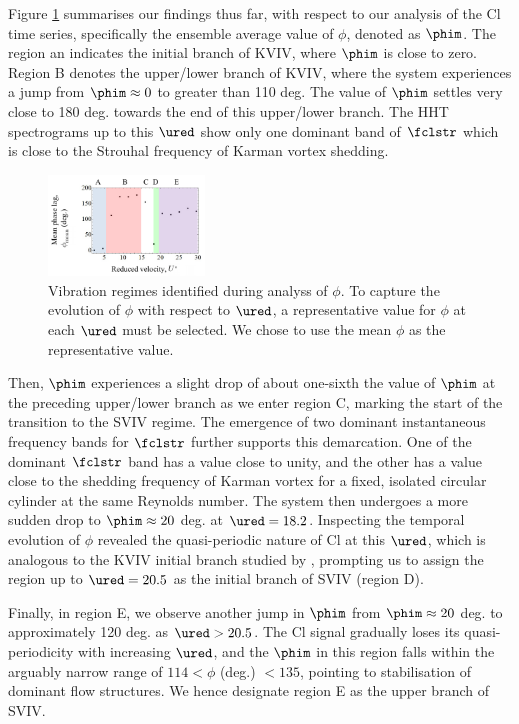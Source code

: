 \documentclass[a4paper,fleqn]{cas-sc}
\begin{document}
Figure \ref{fig:phaseAngleRegime} summarises our findings thus far, with respect to our analysis of the Cl time series, specifically the ensemble average value of  $\phi$, denoted as $\phim$. The region an indicates the initial branch of  KVIV, where  $\phim$ is close to zero. Region B denotes the upper/lower branch of  KVIV, where the system experiences a jump from  $\phim \approx 0$ to greater than 110 deg. The value of $\phim$ settles very close to 180 deg. towards the end of this upper/lower branch. The HHT spectrograms up to this $\ured$ show only one dominant band of $\fclstr$ which is close to the Strouhal frequency of Karman vortex shedding.

\begin{figure}
  \centering
  \includegraphics[width=0.37\textwidth]{figs/figure19}
  \caption{Vibration regimes identified during analyss of $\phi$. To capture the evolution of $\phi$ with respect to $\ured$, a representative value for $\phi$ at each $\ured$ must be selected. We chose to use the mean $\phi$ as the representative value.}
  \label{fig:phaseAngleRegime}
\end{figure}

Then, $\phim$ experiences a slight drop of about one-sixth the value of $\phim$ at the preceding upper/lower branch as we enter region C, marking the start of the transition to the SVIV regime. The emergence of two dominant instantaneous frequency bands for $\fclstr$ further supports this demarcation. One of the dominant $\fclstr$ band has a value close to unity, and the other has a value close to the shedding frequency of Karman vortex for a fixed, isolated circular cylinder at the same Reynolds number. The system then undergoes a more sudden drop to $\phim \approx 20$ deg. at $\ured = 18.2$. Inspecting the temporal evolution of $\phi$ revealed the quasi-periodic nature of Cl at this $\ured$, which is analogous to the KVIV initial branch studied by \citet{Khalak1999}, prompting us to assign the region up to $\ured = 20.5$ as the initial branch of SVIV (region D).

Finally, in region E, we observe another jump in $\phim$ from $\phim \approx 20$ deg. to approximately 120 deg. as $\ured > 20.5$. The Cl signal gradually loses its quasi-periodicity with increasing $\ured$, and the $\phim$ in this region falls within the arguably narrow range of $114 < \phi$ (deg.) $ < 135$, pointing to stabilisation of dominant flow structures. We hence designate region E as the upper branch of SVIV.
\end{document}
